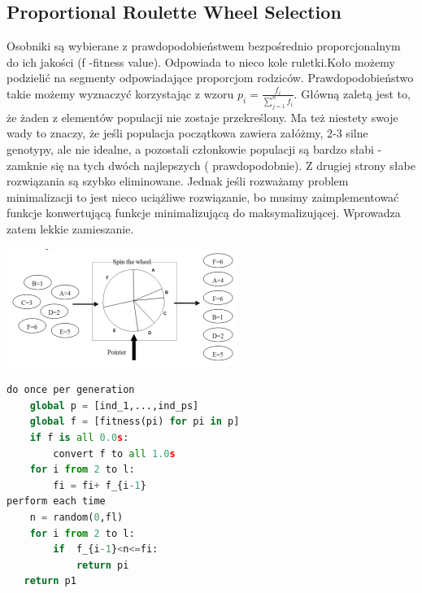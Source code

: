\documentclass[11pt]{article}
\begin{document}
\subsection{Proportional Roulette Wheel Selection}
Osobniki są wybierane z prawdopodobieństwem bezpośrednio proporcjonalnym do ich jakości (f -fitness value). Odpowiada to nieco kole ruletki.Koło możemy podzielić na segmenty odpowiadające proporcjom rodziców. Prawdopodobieństwo takie możemy wyznaczyć korzystając z wzoru $p_i=\frac{f_i}{\sum_{j=1}^nf_i}$. Główną zaletą jest to, że żaden z elementów populacji nie zostaje przekreślony. Ma też niestety swoje wady to znaczy, że jeśli populacja początkowa zawiera załóżmy, 2-3 silne genotypy, ale nie idealne, a pozostali członkowie populacji są bardzo słabi - zamknie się na tych dwóch najlepszych ( prawdopodobnie). Z drugiej strony słabe rozwiązania są szybko eliminowane. Jednak jeśli rozważamy problem minimalizacji to jest nieco uciążliwe rozwiązanie, bo musimy zaimplementować funkcje konwertującą funkcje minimalizującą do maksymalizującej. Wprowadza zatem lekkie zamieszanie.\\
\begin{center}
\includegraphics[scale=.8]{pwr.png}
\end{center} 
\begin{lstlisting}[language=Python]
do once per generation
	global p = [ind_1,...,ind_ps]
	global f = [fitness(pi) for pi in p]
	if f is all 0.0s:
		convert f to all 1.0s
	for i from 2 to l:
		fi = fi+ f_{i-1}
perform each time
	n = random(0,fl)
	for i from 2 to l:
		if  f_{i-1}<n<=fi:
			return pi
   return p1
\end{lstlisting}
\end{document}
